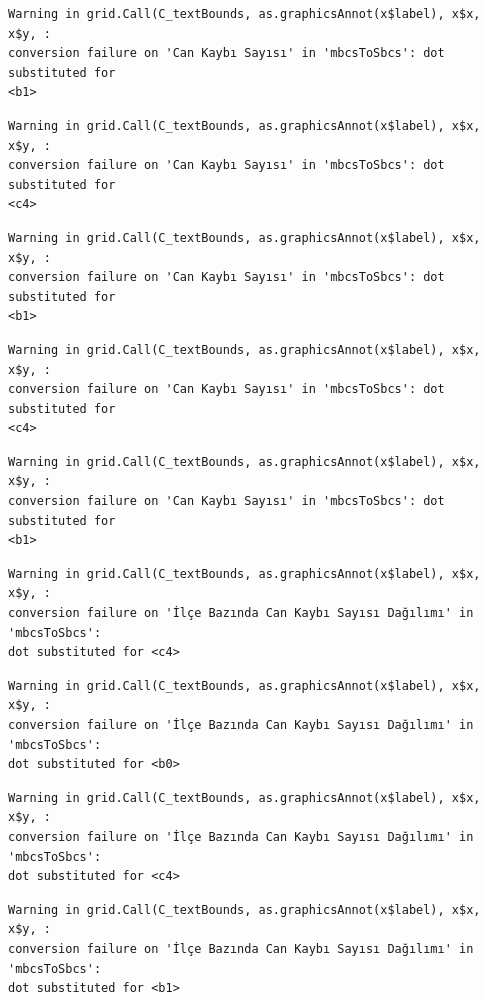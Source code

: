 \documentclass[
  11pt,
  a4paper,
  DIV=11,
  numbers=noendperiod]{scrartcl}
\begin{document}
\begin{verbatim}
Warning in grid.Call(C_textBounds, as.graphicsAnnot(x$label), x$x, x$y, :
conversion failure on 'Can Kaybı Sayısı' in 'mbcsToSbcs': dot substituted for
<b1>
\end{verbatim}

\begin{verbatim}
Warning in grid.Call(C_textBounds, as.graphicsAnnot(x$label), x$x, x$y, :
conversion failure on 'Can Kaybı Sayısı' in 'mbcsToSbcs': dot substituted for
<c4>
\end{verbatim}

\begin{verbatim}
Warning in grid.Call(C_textBounds, as.graphicsAnnot(x$label), x$x, x$y, :
conversion failure on 'Can Kaybı Sayısı' in 'mbcsToSbcs': dot substituted for
<b1>
\end{verbatim}

\begin{verbatim}
Warning in grid.Call(C_textBounds, as.graphicsAnnot(x$label), x$x, x$y, :
conversion failure on 'Can Kaybı Sayısı' in 'mbcsToSbcs': dot substituted for
<c4>
\end{verbatim}

\begin{verbatim}
Warning in grid.Call(C_textBounds, as.graphicsAnnot(x$label), x$x, x$y, :
conversion failure on 'Can Kaybı Sayısı' in 'mbcsToSbcs': dot substituted for
<b1>
\end{verbatim}

\begin{verbatim}
Warning in grid.Call(C_textBounds, as.graphicsAnnot(x$label), x$x, x$y, :
conversion failure on 'İlçe Bazında Can Kaybı Sayısı Dağılımı' in 'mbcsToSbcs':
dot substituted for <c4>
\end{verbatim}

\begin{verbatim}
Warning in grid.Call(C_textBounds, as.graphicsAnnot(x$label), x$x, x$y, :
conversion failure on 'İlçe Bazında Can Kaybı Sayısı Dağılımı' in 'mbcsToSbcs':
dot substituted for <b0>
\end{verbatim}

\begin{verbatim}
Warning in grid.Call(C_textBounds, as.graphicsAnnot(x$label), x$x, x$y, :
conversion failure on 'İlçe Bazında Can Kaybı Sayısı Dağılımı' in 'mbcsToSbcs':
dot substituted for <c4>
\end{verbatim}

\begin{verbatim}
Warning in grid.Call(C_textBounds, as.graphicsAnnot(x$label), x$x, x$y, :
conversion failure on 'İlçe Bazında Can Kaybı Sayısı Dağılımı' in 'mbcsToSbcs':
dot substituted for <b1>
\end{verbatim}
\end{document}
